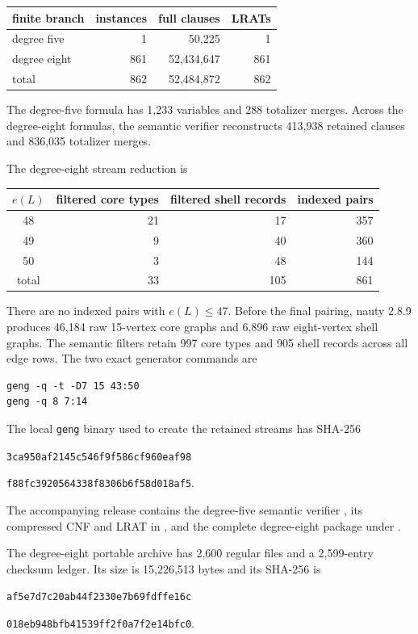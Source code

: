 \documentclass[11pt,reqno,a4paper]{amsart}
\theoremstyle{definition}
\theoremstyle{remark}
\begin{document}
\begin{center}
\begin{tabular}{lrrr}
\toprule
finite branch&instances&full clauses&LRATs\\
\midrule
degree five&1&50,225&1\\
degree eight&861&52,434,647&861\\
\midrule
total&862&52,484,872&862\\
\bottomrule
\end{tabular}
\end{center}
The degree-five formula has 1,233 variables and 288 totalizer merges.
Across the degree-eight formulas, the semantic verifier reconstructs
413,938 retained clauses and 836,035 totalizer merges.

The degree-eight stream reduction is
\begin{center}
\begin{tabular}{c@{\qquad}r@{\qquad}r@{\qquad}r}
\toprule
$e(L)$&filtered core types&filtered shell records&indexed pairs\\
\midrule
48&21&17&357\\
49&9&40&360\\
50&3&48&144\\
\midrule
total&33&105&861\\
\bottomrule
\end{tabular}
\end{center}
There are no indexed pairs with $e(L)\leq47$. Before the final pairing,
nauty 2.8.9 produces 46,184 raw 15-vertex core graphs and 6,896 raw
eight-vertex shell graphs. The semantic filters retain 997 core types and
905 shell records across all edge rows. The two exact generator commands
are
{\small\begin{verbatim}
geng -q -t -D7 15 43:50
geng -q 8 7:14
\end{verbatim}}
The local \texttt{geng} binary used to create the retained streams has
SHA-256
\begin{center}
\texttt{3ca950af2145c546f9f586cf960eaf98}\par\vspace{-2pt}
\texttt{f88fc3920564338f8306b6f58d018af5}.
\end{center}

The accompanying release contains the degree-five semantic verifier
, its compressed CNF and LRAT in
, and the complete degree-eight package under
.

The degree-eight portable archive has 2,600 regular files and a
2,599-entry checksum ledger. Its size is 15,226,513 bytes and its SHA-256
is
\begin{center}
\texttt{af5e7d7c20ab44f2330e7b69fdffe16c}\par\vspace{-2pt}
\texttt{018eb948bfb41539ff2f0a7f2e14bfc0}.
\end{center}
\end{document}
